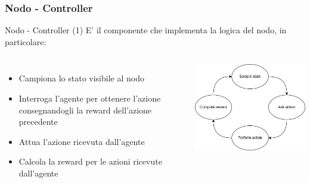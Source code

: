 \documentclass[compress]{beamer}
\begin{document}
\subsubsection*{Nodo - Controller}
\begin{frame}{Nodo - Controller (1)}
E' il componente che implementa la logica del nodo, in particolare:
\vspace{0.5cm}
    \begin{columns}
            \begin{minipage}[b]{1\textwidth}
                \begin{itemize}
                    \item Campiona lo stato visibile al nodo
                    \item Interroga l'agente per ottenere l'azione consegnandogli la reward dell'azione precedente
                    \item Attua l'azione ricevuta dall'agente
                    \item Calcola la reward per le azioni ricevute dall'agente
                \end{itemize}
            \end{minipage}
            \begin{minipage}{.9\textwidth}
                \begin{adjustbox}{margin=0.5cm 0cm 0.1cm 0.2cm, center} %
                    \includegraphics[width=1\textwidth]{figs/control_loop.png}
                \end{adjustbox}
            \end{minipage}
    \end{columns}
\end{frame}
\end{document}
